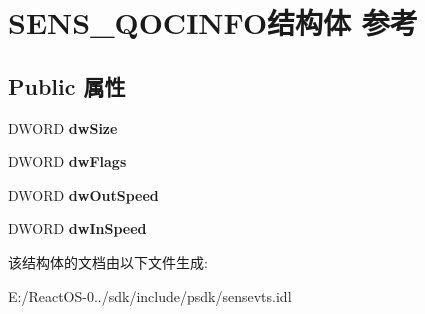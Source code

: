 \hypertarget{struct_s_e_n_s___q_o_c_i_n_f_o}{}\section{S\+E\+N\+S\+\_\+\+Q\+O\+C\+I\+N\+F\+O结构体 参考}
\label{struct_s_e_n_s___q_o_c_i_n_f_o}
\subsection*{Public 属性}
\begin{DoxyCompactItemize}
\item 
\mbox{\label{struct_s_e_n_s___q_o_c_i_n_f_o_a52ad7a869db145c02fc675a1aacad870}} 
D\+W\+O\+RD {\bfseries dw\+Size}
\item 
\mbox{\label{struct_s_e_n_s___q_o_c_i_n_f_o_a806db34641be568d4995f0d7be532285}} 
D\+W\+O\+RD {\bfseries dw\+Flags}
\item 
\mbox{\label{struct_s_e_n_s___q_o_c_i_n_f_o_aa4d6417319b506fecdbe1b2cac4ab1bf}} 
D\+W\+O\+RD {\bfseries dw\+Out\+Speed}
\item 
\mbox{\label{struct_s_e_n_s___q_o_c_i_n_f_o_add23f530f38ab798ca646bcbfdb7e064}} 
D\+W\+O\+RD {\bfseries dw\+In\+Speed}
\end{DoxyCompactItemize}


该结构体的文档由以下文件生成\+:\begin{DoxyCompactItemize}
\item 
E\+:/\+React\+O\+S-\/0../sdk/include/psdk/sensevts.\+idl\end{DoxyCompactItemize}
